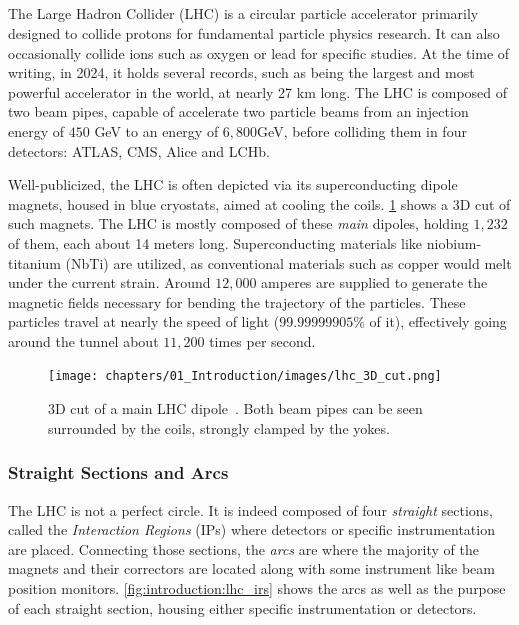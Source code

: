 \subsection{}

The Large Hadron Collider (LHC) is a circular particle accelerator primarily designed to collide
protons for fundamental particle physics research. It can also occasionally collide ions such as
oxygen or lead for specific studies. At the time of writing, in 2024, it holds several records,
such as being the largest and most powerful accelerator in the world, at nearly 27 km long. The LHC
is composed of two beam pipes, capable of accelerate two particle beams from an injection energy
of $450$ GeV to an energy of $6,800$GeV, before colliding them in four detectors: ATLAS, CMS, Alice
and LCHb.

Well-publicized, the LHC is often depicted via its superconducting dipole magnets, housed in blue
cryostats, aimed at cooling the coils. \cref{fig:3d_cut_dipole} shows a 3D cut of such magnets. The
LHC is mostly composed of these \textit{main} dipoles, holding $1,232$ of them, each about 14 meters
long. Superconducting materials like niobium-titanium (NbTi) are utilized, as conventional materials
such as copper would melt under the current strain. Around $12,000$ amperes are supplied to generate
the magnetic fields necessary for bending the trajectory of the particles. These particles travel
at nearly the speed of light ($99.99999905\%$ of it), effectively going around the tunnel about
$11,200$ times per second.

\begin{figure}[!htb]
    \centering
    \texttt{[image: chapters/01\_Introduction/images/lhc\_3D\_cut.png]}
    \caption{3D cut of a main LHC dipole~\cite{noauthor_cern_nodate}. Both beam pipes can be seen
    surrounded by the coils, strongly clamped by the yokes.}
    \label{fig:3d_cut_dipole}
\end{figure}


\subsubsection{Straight Sections and Arcs}

The LHC is not a perfect circle. It is indeed composed of four \textit{straight} sections, called
the \textit{Interaction Regions} (IPs) where detectors or specific instrumentation are placed. Connecting
those sections, the \textit{arcs} are where the majority of the magnets and their correctors are
located along with some instrument like beam position monitors.
\cref{fig:introduction:lhc_irs} shows the arcs as well as the purpose of each straight section,
housing either specific instrumentation or detectors.


